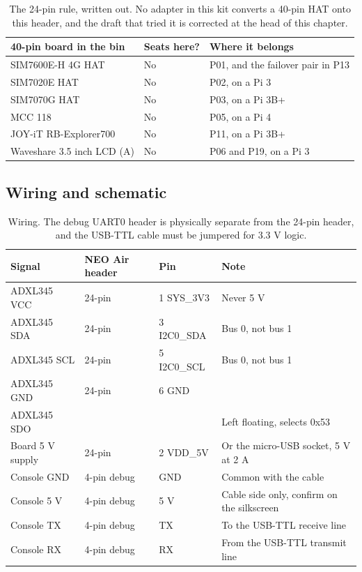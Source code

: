\begin{table}[H]\centering\small
\begin{tabular}{p{44mm}p{26mm}p{74mm}}
\toprule
40-pin board in the bin & Seats here? & Where it belongs \\
\midrule
SIM7600E-H 4G HAT & No & P01, and the failover pair in P13 \\
SIM7020E HAT & No & P02, on a Pi 3 \\
SIM7070G HAT & No & P03, on a Pi 3B+ \\
MCC 118 & No & P05, on a Pi 4 \\
JOY-iT RB-Explorer700 & No & P11, on a Pi 3B+ \\
Waveshare 3.5 inch LCD (A) & No & P06 and P19, on a Pi 3 \\
\bottomrule
\end{tabular}
\caption{The 24-pin rule, written out. No adapter in this kit converts a 40-pin HAT onto this header, and the draft that tried it is corrected at the head of this chapter.}
\end{table}

\subsection*{Wiring and schematic}


\begin{table}[H]\centering\small
\begin{tabular}{p{40mm}p{28mm}p{22mm}p{58mm}}
\toprule
Signal & NEO Air header & Pin & Note \\
\midrule
ADXL345 VCC & 24-pin & 1 SYS\_3V3 & Never 5 V \\
ADXL345 SDA & 24-pin & 3 I2C0\_SDA & Bus 0, not bus 1 \\
ADXL345 SCL & 24-pin & 5 I2C0\_SCL & Bus 0, not bus 1 \\
ADXL345 GND & 24-pin & 6 GND & \\
ADXL345 SDO & & & Left floating, selects 0x53 \\
Board 5 V supply & 24-pin & 2 VDD\_5V & Or the micro-USB socket, 5 V at 2 A \\
Console GND & 4-pin debug & GND & Common with the cable \\
Console 5 V & 4-pin debug & 5 V & Cable side only, confirm on the silkscreen \\
Console TX & 4-pin debug & TX & To the USB-TTL receive line \\
Console RX & 4-pin debug & RX & From the USB-TTL transmit line \\
\bottomrule
\end{tabular}
\caption{Wiring. The debug UART0 header is physically separate from the 24-pin header, and the USB-TTL cable must be jumpered for 3.3 V logic.}
\end{table}

